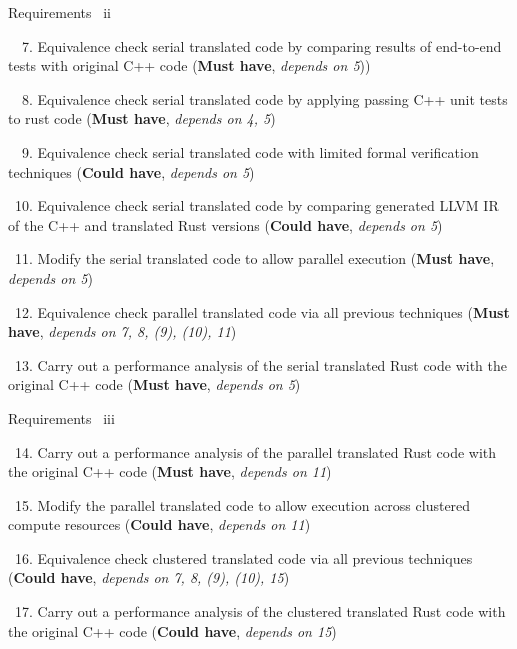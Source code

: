 \documentclass[10pt,aspectratio=169]{beamer}
\newcommand{\cmark}{\ding{51}}%
\newcommand{\done}{\rlap{$\square$}{\raisebox{2pt}{\large\hspace{1pt}\cmark}}%
\hspace{-2.5pt}}
\begin{document}
\begin{frame}{Requirements \ ii}
    \begin{todolist}
        \item[\done\ \ 7.]
          Equivalence check serial translated code by comparing results of end-to-end tests with original C++ code
          (\textbf{Must have}, \textit{depends on 5}))
        \item[\done\ \ 8.]
          Equivalence check serial translated code by applying passing C++ unit tests to rust code
          (\textbf{Must have}, \textit{depends on 4, 5})
        \item[\done\ \ 9.]
          Equivalence check serial translated code with limited formal verification techniques
          (\textbf{Could have}, \textit{depends on 5})
        \item[\done\ 10.]
          Equivalence check serial translated code by comparing generated LLVM IR of the C++ and translated Rust versions
          (\textbf{Could have}, \textit{depends on 5})
        \item[\done\ 11.]
          Modify the serial translated code to allow parallel execution
          (\textbf{Must have}, \textit{depends on 5})
        \item[\done\ 12.]
          Equivalence check parallel translated code via all previous techniques
          (\textbf{Must have}, \textit{depends on 7, 8, (9), (10), 11})
        \item[\done\ 13.]
          Carry out a performance analysis of the serial translated Rust code with the original C++ code
          (\textbf{Must have}, \textit{depends on 5})
    \end{todolist}
\end{frame}

\begin{frame}{Requirements \ iii}
    \begin{todolist}
        \item[\done\ 14.]
          Carry out a performance analysis of the parallel translated Rust code with the original C++ code
          (\textbf{Must have}, \textit{depends on 11})
        \item[\done\ 15.]
          Modify the parallel translated code to allow execution across clustered compute resources
          (\textbf{Could have}, \textit{depends on 11})
        \item[\done\ 16.]
          Equivalence check clustered translated code via all previous techniques
          (\textbf{Could have}, \textit{depends on 7, 8, (9), (10), 15})
        \item[\done\ 17.]
          Carry out a performance analysis of the clustered translated Rust code with the original C++ code
          (\textbf{Could have}, \textit{depends on 15})
    \end{todolist}
\end{frame}
\end{document}
